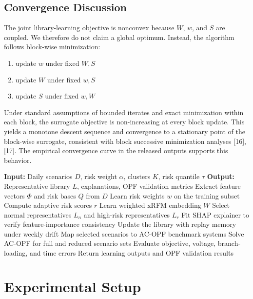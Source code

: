 \documentclass[journal]{IEEEtran}
\begin{document}
\subsection{Convergence Discussion}
The joint library-learning objective is nonconvex because $W$, $w$, and $S$ are coupled. We therefore do not claim a global optimum. Instead, the algorithm follows block-wise minimization:
\begin{enumerate}
\item update $w$ under fixed $W,S$
\item update $W$ under fixed $w,S$
\item update $S$ under fixed $w,W$
\end{enumerate}
Under standard assumptions of bounded iterates and exact minimization within each block, the surrogate objective is non-increasing at every block update. This yields a monotone descent sequence and convergence to a stationary point of the block-wise surrogate, consistent with block successive minimization analyses [16],[17]. The empirical convergence curve in the released outputs supports this behavior.

\begin{algorithm}[!t]
\caption{Adaptive Risk-Aware Dual-Library Learning With AC-OPF Validation}
\label{alg:main}
\begin{algorithmic}
\STATE \textbf{Input:} Daily scenarios $D$, risk weight $\alpha$, clusters $K$, risk quantile $\tau$
\STATE \textbf{Output:} Representative library $L$, explanations, OPF validation metrics
\STATE Extract feature vectors $\Phi$ and risk bases $Q$ from $D$
\STATE Learn risk weights $w$ on the training subset
\STATE Compute adaptive risk scores $r$
\STATE Learn weighted xRFM embedding $W$
\STATE Select normal representatives $L_n$ and high-risk representatives $L_r$
\STATE Fit SHAP explainer to verify feature-importance consistency
\STATE Update the library with replay memory under weekly drift
\STATE Map selected scenarios to AC-OPF benchmark systems
\STATE Solve AC-OPF for full and reduced scenario sets
\STATE Evaluate objective, voltage, branch-loading, and time errors
\STATE Return learning outputs and OPF validation results
\end{algorithmic}
\end{algorithm}

\section{Experimental Setup}
\end{document}
